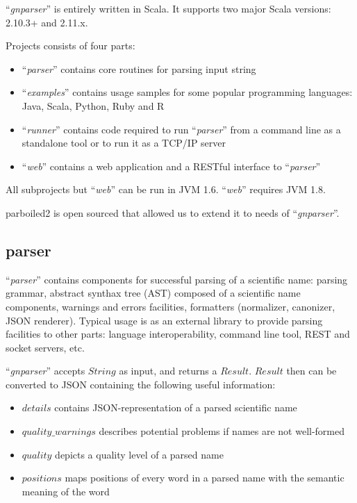 \documentclass{bmcart}
\begin{document}
``\textit{gnparser}'' is entirely written in Scala. It supports two major
Scala versions: 2.10.3+ and 2.11.x.

Projects consists of four parts:

\begin{itemize}
  \item ``\textit{parser}'' contains core routines for parsing input string
  \item ``\textit{examples}'' contains usage samples for some popular
  programming languages: Java, Scala, Python, Ruby and R
  \item ``\textit{runner}'' contains code required to run ``\textit{parser}''
  from a command line as a standalone tool or to run it as a TCP/IP server
  \item ``\textit{web}'' contains a web application and a RESTful interface to
  ``\textit{parser}''
\end{itemize}

All subprojects but ``\textit{web}'' can be run in JVM 1.6. ``\textit{web}''
requires JVM 1.8.

parboiled2 is open sourced that allowed us to extend it to needs of
``\textit{gnparser}''.

\subsection*{parser}

``\textit{parser}'' contains components for successful parsing of a scientific
name: parsing grammar, abstract synthax tree (AST) composed of a scientific
name components, warnings and errors facilities, formatters (normalizer,
canonizer, JSON \cite{bray2014javascript} renderer). Typical usage is as an
external library to provide parsing facilities to other parts: language
interoperability, command line tool, REST and socket servers, etc.

``\textit{gnparser}'' accepts $String$ as input, and returns a $Result$.
$Result$ then can be converted to JSON containing the following useful
information:

\begin{itemize}
  \item $details$ contains JSON-representation of a parsed scientific name
  \item $quality\_warnings$ describes potential problems if names are not
    well-formed
  \item $quality$ depicts a quality level of a parsed name
  \item $positions$ maps positions of every word in a parsed name with
    the semantic meaning of the word
\end{itemize}
\end{document}
